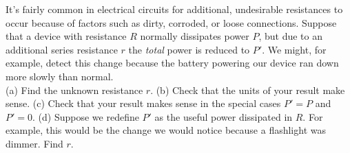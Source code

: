 It's fairly common in electrical circuits for additional, undesirable resistances to occur
because of factors such as dirty, corroded, or loose connections. Suppose that a device
with resistance $R$ normally dissipates power $P$, but due to an additional series resistance $r$
the \emph{total} power is reduced to $P'$. We might, for example, detect this change because
the battery powering our device ran down more slowly than normal. \\
(a) Find the unknown resistance $r$.\answercheck\hwendpart
(b) Check that the units of your result make sense.\hwendpart
(c) Check that your result makes sense in the special cases $P'=P$ and $P'=0$.\hwendpart
(d) Suppose we redefine $P'$ as the useful power dissipated in $R$. For example,
this would be the change we would notice because a flashlight was dimmer. Find $r$.\answercheck
